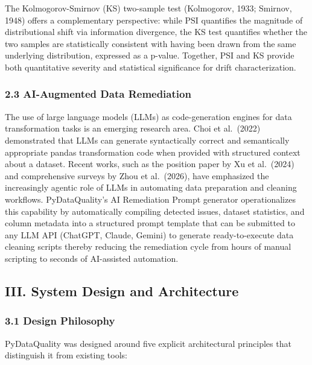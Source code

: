 \documentclass{article}
\begin{document}
The Kolmogorov-Smirnov (KS) two-sample test (Kolmogorov, 1933; Smirnov,
1948) offers a complementary perspective: while PSI quantifies the
magnitude of distributional shift via information divergence, the KS
test quantifies whether the two samples are statistically consistent
with having been drawn from the same underlying distribution, expressed
as a p-value. Together, PSI and KS provide both quantitative severity
and statistical significance for drift characterization.

\subsubsection{2.3 AI-Augmented Data
Remediation}\label{ai-augmented-data-remediation}

The use of large language models (LLMs) as code-generation engines for
data transformation tasks is an emerging research area. Choi et
al.~(2022) demonstrated that LLMs can generate syntactically correct and
semantically appropriate pandas transformation code when provided with
structured context about a dataset. Recent works, such as the position
paper by Xu et al.~(2024) and comprehensive surveys by Zhou et
al.~(2026), have emphasized the increasingly agentic role of LLMs in
automating data preparation and cleaning workflows. PyDataQuality's AI
Remediation Prompt generator operationalizes this capability by
automatically compiling detected issues, dataset statistics, and column
metadata into a structured prompt template that can be submitted to any
LLM API (ChatGPT, Claude, Gemini) to generate ready-to-execute data
cleaning scripts thereby reducing the remediation cycle from hours of
manual scripting to seconds of AI-assisted automation.

\subsection{III. System Design and
Architecture}\label{iii.-system-design-and-architecture}

\subsubsection{3.1 Design Philosophy}\label{design-philosophy}

PyDataQuality was designed around five explicit architectural principles
that distinguish it from existing tools:
\end{document}
